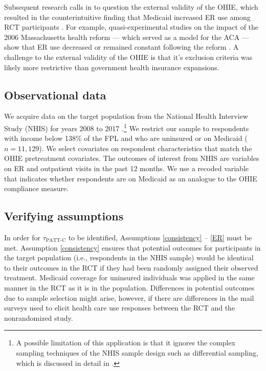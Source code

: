 \documentclass[hidelinks,12pt]{article}
\begin{document}
{{Subsequent research calls in to question the external validity of the OHIE, which resulted in the counterintuitive finding that Medicaid increased ER use among RCT participants \citep{finkelstein2012,Taubman}. For example, quasi-experimental studies on the impact of the 2006 Massachusetts health reform --- which served as a model for the ACA --- show that ER use decreased or remained constant following the reform \citep{miller2012effect, kolstad2012impact}. A challenge to the external validity of the OHIE is that it's exclusion criteria was likely more restrictive than government health insurance expansions. 
}

\subsection{Observational data} 

We acquire data on the target population from the National Health Interview Study (NHIS) for years {\color{red}2008 to 2017} \citep{NHIS}.\footnote{{\color{red}A possible limitation of this application is that it ignores the complex sampling techniques of the NHIS sample design such as differential sampling, which is discussed in detail in \citet{parsons2014design}.}\label{nhis-ftn}} We restrict our sample to respondents with income below 138\% of the FPL and who are uninsured or on Medicaid {\color{red}($n=11,129$)}. We select covariates on respondent characteristics that match the OHIE pretreatment covariates. The outcomes of interest from NHIS are variables on ER and outpatient visits in the past 12 months. We use a recoded variable that indicates whether respondents are on Medicaid as an analogue to the OHIE compliance measure. 

\subsection{Verifying assumptions} \label{verifying}

In order for $\tau_{\text{PATT-C}}$ to be identified, Assumptions \ref{consistency} -- \ref{ER} must be met. Assumption \ref{consistency} ensures that potential outcomes for participants in the target population (i.e., respondents in the NHIS sample) would be identical to their outcomes in the RCT if they had been randomly assigned their observed treatment. {\color{red}Medicaid coverage for uninsured individuals was applied in the same manner in the RCT as it is in the population.  Differences in potential outcomes due to sample selection might arise, however, if there are differences in the mail surveys used to elicit health care use responses between the RCT and the nonrandomized study. }
 
}
\end{document}
